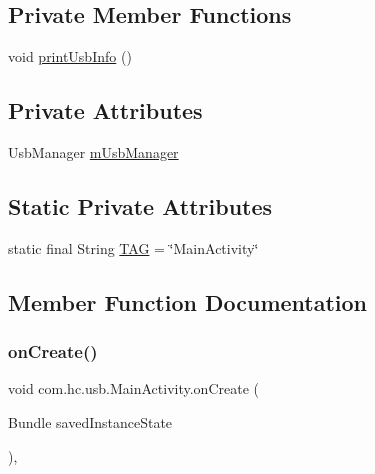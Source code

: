 \subsection*{Private Member Functions}
\begin{DoxyCompactItemize}
\item 
void \mbox{\hyperlink{classcom_1_1hc_1_1usb_1_1_main_activity_abe05f9629f853d744ce45c776cf9930e}{print\+Usb\+Info}} ()
\end{DoxyCompactItemize}
\subsection*{Private Attributes}
\begin{DoxyCompactItemize}
\item 
Usb\+Manager \mbox{\hyperlink{classcom_1_1hc_1_1usb_1_1_main_activity_a34a5c06a51aa843f15b4c0677c48d288}{m\+Usb\+Manager}}
\end{DoxyCompactItemize}
\subsection*{Static Private Attributes}
\begin{DoxyCompactItemize}
\item 
static final String \mbox{\hyperlink{classcom_1_1hc_1_1usb_1_1_main_activity_a6ac2d8bf5d6fdb9288c6aae6a05eec3a}{T\+AG}} = \char`\"{}Main\+Activity\char`\"{}
\end{DoxyCompactItemize}


\subsection{Member Function Documentation}
\mbox{\label{classcom_1_1hc_1_1usb_1_1_main_activity_acca2ed5d06d58ec04eb8380f568fa224}} 
\subsubsection{\texorpdfstring{on\+Create()}{onCreate()}}
{\footnotesize\ttfamily void com.\+hc.\+usb.\+Main\+Activity.\+on\+Create (\begin{DoxyParamCaption}\item[{Bundle}]{saved\+Instance\+State }\end{DoxyParamCaption})\hspace{0.3cm}{\ttfamily [inline]}, {\ttfamily [protected]}}

